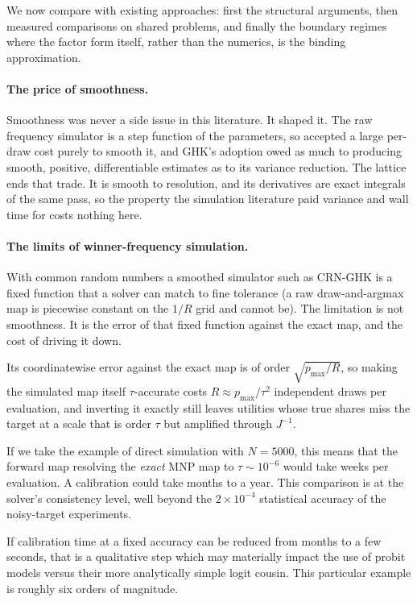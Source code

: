 \documentclass[12pt]{article}
\theoremstyle{remark}
\begin{document}
We now compare with existing approaches: first the structural
arguments, then measured comparisons on shared problems, and finally
the boundary regimes where the factor form itself, rather than the
numerics, is the binding approximation.

\paragraph{The price of smoothness.} Smoothness was never a side
issue in this literature. It shaped it. The raw frequency simulator is a
step function of the parameters, so \citet{stern1992} accepted a large
per-draw cost purely to smooth it, and GHK's adoption owed as much to
producing smooth, positive, differentiable estimates
\citep{hajivassiliou1998} as to its variance reduction. The lattice ends
that trade. It is smooth to resolution, and its derivatives are exact
integrals of the same pass, so the property the simulation literature
paid variance and wall time for costs nothing here.

\paragraph{The limits of winner-frequency simulation.} With common
random numbers a smoothed simulator such as CRN-GHK is a fixed function
that a solver can match to fine tolerance (a raw draw-and-argmax map is
piecewise constant on the $1/R$ grid and cannot be). The limitation is
not smoothness. It is the error of that fixed function against the
exact map, and the cost of driving it down.

Its coordinatewise error against the exact map is of order
$\sqrt{p_{\max}/R}$, so making the simulated map itself $\tau$-accurate
costs $R \approx p_{\max}/\tau^2$ independent draws per evaluation, and
inverting it exactly still leaves utilities whose true shares miss the
target at a scale that is order $\tau$ but amplified through $J^{-1}$.

If we take the example of direct simulation with $N = 5000$, this
means that the forward map resolving the \emph{exact} MNP map to $\tau \sim
10^{-6}$  would take
weeks per evaluation. A calibration could take months to a year. This comparison is at the
solver's consistency level, well beyond the $2\times10^{-4}$
statistical accuracy of the noisy-target experiments. 

If calibration time at a fixed accuracy can be reduced from months to
a few seconds, that is a qualitative step which may materially impact
the use of probit models versus their more analytically simple logit
cousin. This particular example is roughly six orders of magnitude. 
\end{document}
